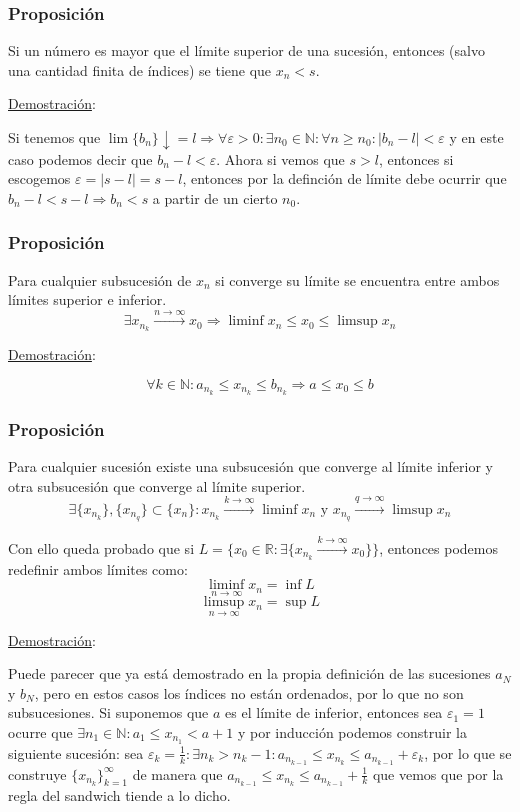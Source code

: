 \documentclass[10pt,a4paper,openright]{book}
\begin{document}
\subsubsection*{Proposición}
Si un número es mayor que el límite superior de una sucesión, entonces (salvo una cantidad finita de índices) se tiene que $x_n<s$.\par

\underline{Demostración}:\par
Si tenemos que $\lim \{b_n\}\downarrow = l\Rightarrow \forall \varepsilon>0 : \exists n_0\in \mathbb N: \forall n\geq n_0: |b_n-l|<\varepsilon $ y en este caso podemos decir que $b_n-l<\varepsilon$. Ahora si vemos que $s>l$, entonces si escogemos $\varepsilon = |s-l|=s-l$, entonces por la definción de límite debe ocurrir que $b_n-l<s-l\Rightarrow b_n<s$ a partir de un cierto $n_0$.

\subsubsection*{Proposición}
Para cualquier subsucesión de $x_n$ si converge su límite se encuentra entre ambos límites superior e inferior.
$$\exists x_{n_k}\xrightarrow{n\rightarrow\infty}x_0\Rightarrow \liminf x_n \leq x_0 \leq \limsup x_n$$

\underline{Demostración}:\par
$$\forall k\in \mathbb N: a_{n_k}\leq x_{n_k} \leq b_{n_k} \Rightarrow a\leq x_0 \leq b$$

\subsubsection*{Proposición}
Para cualquier sucesión existe una subsucesión que converge al límite inferior y otra subsucesión que converge al límite superior.
$$\exists \{x_{n_k}\}, \{x_{n_q}\}\subset \{x_n\}: x_{n_k}\xrightarrow{k\rightarrow \infty} \liminf x_n \mbox{ y } x_{n_q}\xrightarrow{q\rightarrow \infty} \limsup x_n$$

Con ello queda probado que si $L=\{x_0\in \mathbb R: \exists \{x_{n_k}\xrightarrow{k\rightarrow \infty} x_0\}\}$, entonces podemos redefinir ambos límites como:
$$\liminf_{n\rightarrow\infty}x_n=\inf L$$
$$\limsup_{n\rightarrow\infty}x_n=\sup L$$


\underline{Demostración}:\par
Puede parecer que ya está demostrado en la propia definición de las sucesiones $a_N$ y $b_N$, pero en estos casos los índices no están ordenados, por lo que no son subsucesiones.
Si suponemos que $a$ es el límite de inferior, entonces sea $\varepsilon_1=1$ ocurre que $\exists n_1\in \mathbb N: a_1\leq x_{n_1}<a+1$ y por inducción podemos construir la siguiente sucesión: sea $\varepsilon_k= \frac{1}{k} : \exists n_k > n_k -1: a_{n_{k-1}}\leq x_{n_k}\leq a_{n_{k-1}}+\varepsilon_k$, por lo que se construye $\{x_{n_k}\}_{k=1}^\infty$ de manera que $a_{n_{k-1}}\leq x_{n_k}\leq a_{n_{k-1}}+\frac{1}{k}$ que vemos que por la regla del sandwich tiende a lo dicho.
\end{document}
